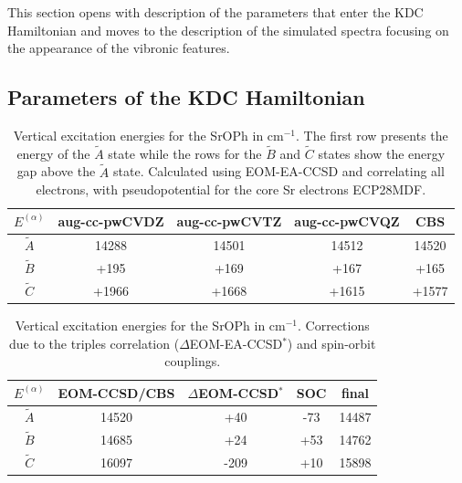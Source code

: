 \documentclass{article}
\begin{document}
This section opens with description of the parameters that enter the KDC
Hamiltonian and moves to the description of the simulated spectra focusing on
the appearance of the vibronic features.

\subsection{Parameters of the KDC Hamiltonian}
\label{sec:results:parameters}

\begin{table}
    \center
    \begin{tabular}{|c|c|c|c|c|}
        \hline
    $E ^{(\alpha)}$ & aug-cc-pwCVDZ & aug-cc-pwCVTZ & aug-cc-pwCVQZ & CBS \\
        \hline
    $\tilde{A}$ &   14288 &   14501 &   14512 &   14520 \\
    $\tilde{B}$ &    +195 &    +169 &    +167 &    +165 \\
    $\tilde{C}$ &   +1966 &   +1668 &   +1615 &   +1577 \\
        \hline
    \end{tabular}
    \caption{
        Vertical excitation energies for the SrOPh in cm$^{-1}$. The first row
        presents the energy of the $\tilde{A}$ state while the rows for the
        $\tilde{B}$ and $\tilde{C}$ states show the energy gap above the
        $\tilde{A}$ state. Calculated using EOM-EA-CCSD and correlating all
        electrons, with pseudopotential for the core Sr electrons ECP28MDF.
    }
    \label{tab:sroph_vertical_cbs}
\end{table}

\begin{table}
    \center
    \begin{tabular}{|c|c|c|c|c|}
        \hline
    $E ^{(\alpha)}$ & EOM-CCSD/CBS & $\Delta$EOM-CCSD$^*$ & SOC & final \\
        \hline             
    $\tilde{A}$ &  14520       &  +40 & -73 & 14487 \\
    $\tilde{B}$ &  14685       &  +24 & +53 & 14762 \\
    $\tilde{C}$ &  16097       & -209 & +10 & 15898 \\
        \hline
    \end{tabular}
    \caption{
        Vertical excitation energies for the SrOPh in cm$^{-1}$. Corrections
        due to the triples correlation ($\Delta$EOM-EA-CCSD$^*$) and spin-orbit
        couplings.
    }
    \label{tab:sroph_vertical_dT_SOC}
\end{table}
\end{document}
